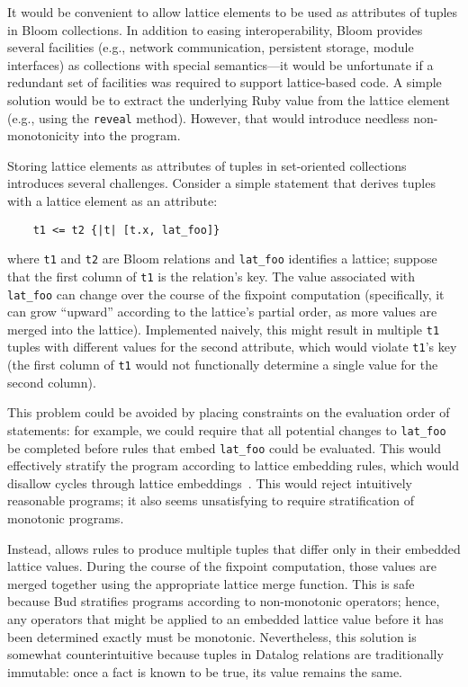 It would be convenient to allow lattice elements to be used as attributes of
tuples in Bloom collections. In addition to easing interoperability, Bloom
provides several facilities (e.g., network communication, persistent storage,
module interfaces) as collections with special semantics---it would be
unfortunate if a redundant set of facilities was required to support
lattice-based code. A simple solution would be to extract the underlying Ruby
value from the lattice element (e.g., using the \texttt{reveal} method).
However, that would introduce needless non-monotonicity into the program.

Storing lattice elements as attributes of tuples in set-oriented collections
introduces several challenges. Consider a simple \lang statement that derives
tuples with a lattice element as an attribute:
\begin{verbatim}
    t1 <= t2 {|t| [t.x, lat_foo]}
\end{verbatim}
where \texttt{t1} and \texttt{t2} are Bloom relations and \texttt{lat\_foo}
identifies a lattice; suppose that the first column of \texttt{t1} is the
relation's key. The value associated with \texttt{lat\_foo} can change over the
course of the fixpoint computation (specifically, it can grow ``upward''
according to the lattice's partial order, as more values are merged into the
lattice). Implemented naively, this might result in multiple \texttt{t1} tuples
with different values for the second attribute, which would violate
\texttt{t1}'s key (the first column of \texttt{t1} would not functionally
determine a single value for the second column).

This problem could be avoided by placing constraints on the evaluation order of
statements: for example, we could require that all potential changes to
\texttt{lat\_foo} be completed before rules that embed \texttt{lat\_foo} could
be evaluated. This would effectively stratify the program according to lattice
embedding rules, which would disallow cycles through lattice
embeddings~\cite{Apt1988}. This would reject intuitively reasonable programs; it
also seems unsatisfying to require stratification of monotonic programs.

Instead, \lang allows rules to produce multiple tuples that differ only in their
embedded lattice values. During the course of the fixpoint computation, those
values are merged together using the appropriate lattice merge function. This is
safe because Bud stratifies programs according to non-monotonic operators;
hence, any operators that might be applied to an embedded lattice value before
it has been determined exactly must be monotonic. Nevertheless, this solution is
somewhat counterintuitive because tuples in Datalog relations are traditionally
immutable: once a fact is known to be true, its value remains the
same.%

